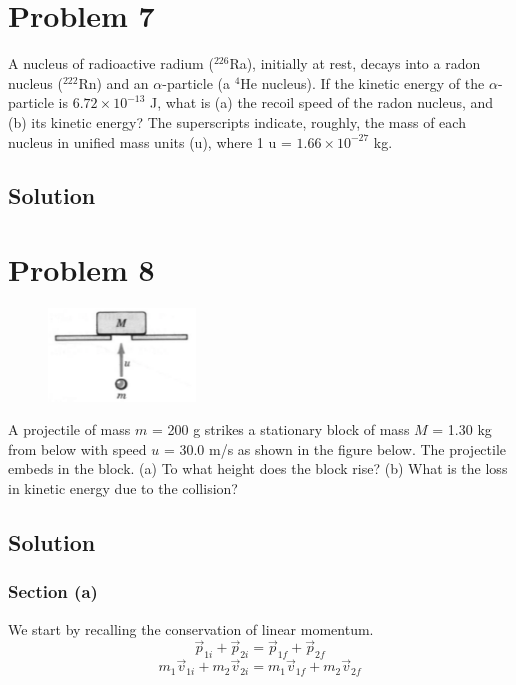 \documentclass[12pt]{article}
\begin{document}
\pagebreak
\section*{Problem 7}
A nucleus of radioactive radium ($^{226}$Ra), initially at rest, decays into a radon nucleus ($^{222}$Rn) and an $\alpha$-particle (a $^{4}$He nucleus). If the kinetic energy of the $\alpha$-particle is $6.72 \times 10^{-13}$ J, what is (a) the recoil speed of the radon nucleus, and (b) its kinetic energy? The superscripts indicate, roughly, the mass of each nucleus in unified mass units (u), where 1 u = $1.66 \times 10^{-27}$ kg.

\subsection*{Solution}


\pagebreak
\section*{Problem 8}
\begin{figure}
    \vspace{-30pt}
    \includegraphics[width=0.35\textwidth]{graph_8.png} 
\end{figure}
A projectile of mass $m$ = 200 g strikes a stationary block of mass $M$ = 1.30 kg from below with speed $u$ = 30.0 m/s as shown in the figure below. The projectile embeds in the block. (a) To what height does the block rise? (b) What is the loss in kinetic energy due to the collision?

\subsection*{Solution}
\subsubsection*{Section (a)}
We start by recalling the conservation of linear momentum.
\[ \vec{p}_{1i} + \vec{p}_{2i} = \vec{p}_{1f} + \vec{p}_{2f} \]
\[ m_1\vec{v}_{1i} + m_2\vec{v}_{2i} = m_1\vec{v}_{1f} + m_2\vec{v}_{2f} \]
\end{document}
